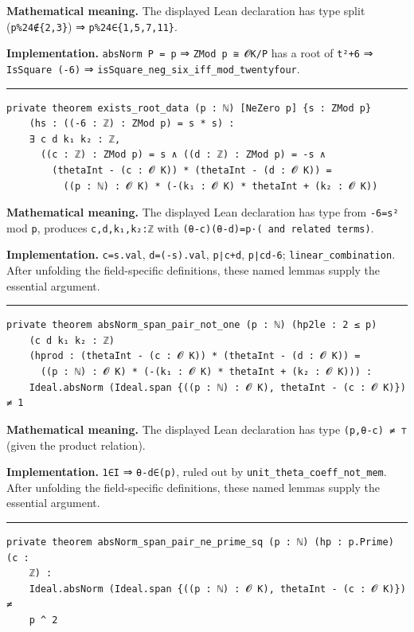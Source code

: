 \documentclass[UTF8,a4paper,11pt,fontset=fandol]{ctexart}
\theoremstyle{definition}
\newcommand{\statementsep}{\par\medskip\hrule\medskip}
\begin{document}
\noindent\textbf{Mathematical meaning.} The displayed Lean declaration has type split (\texttt{p\%24∉\{2,3\}}) ⇒ \texttt{p\%24∈\{1,5,7,11\}}.\par
\noindent\textbf{Implementation.} \texttt{absNorm P = p} ⇒ \texttt{ZMod p ≅ 𝓞K/\allowbreak{}P} has a root of \texttt{t²+6} ⇒ \texttt{IsSquare (-6)} ⇒ \texttt{isSquare\_\allowbreak{}neg\_\allowbreak{}six\_\allowbreak{}iff\_\allowbreak{}mod\_\allowbreak{}twentyfour}.\par
\statementsep
\begin{verbatim}
private theorem exists_root_data (p : ℕ) [NeZero p] {s : ZMod p}
    (hs : ((-6 : ℤ) : ZMod p) = s * s) :
    ∃ c d k₁ k₂ : ℤ,
      ((c : ℤ) : ZMod p) = s ∧ ((d : ℤ) : ZMod p) = -s ∧
        (thetaInt - (c : 𝓞 K)) * (thetaInt - (d : 𝓞 K)) =
          ((p : ℕ) : 𝓞 K) * (-(k₁ : 𝓞 K) * thetaInt + (k₂ : 𝓞 K))
\end{verbatim}
\noindent\textbf{Mathematical meaning.} The displayed Lean declaration has type from \texttt{-6=s²} mod \texttt{p}, produces \texttt{c,d,k₁,k₂:ℤ} with \texttt{(θ-c)(θ-d)=p·( and related terms)}.\par
\noindent\textbf{Implementation.} \texttt{c=s.\allowbreak{}val}, \texttt{d=(-s).\allowbreak{}val}, \texttt{p∣c+d}, \texttt{p∣cd-6}; \texttt{linear\_\allowbreak{}combination}. After unfolding the field-specific definitions, these named lemmas supply the essential argument.\par
\statementsep
\begin{verbatim}
private theorem absNorm_span_pair_not_one (p : ℕ) (hp2le : 2 ≤ p)
    (c d k₁ k₂ : ℤ)
    (hprod : (thetaInt - (c : 𝓞 K)) * (thetaInt - (d : 𝓞 K)) =
      ((p : ℕ) : 𝓞 K) * (-(k₁ : 𝓞 K) * thetaInt + (k₂ : 𝓞 K))) :
    Ideal.absNorm (Ideal.span {((p : ℕ) : 𝓞 K), thetaInt - (c : 𝓞 K)}) ≠ 1
\end{verbatim}
\noindent\textbf{Mathematical meaning.} The displayed Lean declaration has type \texttt{(p,θ-c) ≠ ⊤} (given the product relation).\par
\noindent\textbf{Implementation.} \texttt{1∈I} ⇒ \texttt{θ-d∈(p)}, ruled out by \texttt{unit\_\allowbreak{}theta\_\allowbreak{}coeff\_\allowbreak{}not\_\allowbreak{}mem}. After unfolding the field-specific definitions, these named lemmas supply the essential argument.\par
\statementsep
\begin{verbatim}
private theorem absNorm_span_pair_ne_prime_sq (p : ℕ) (hp : p.Prime) (c :
    ℤ) :
    Ideal.absNorm (Ideal.span {((p : ℕ) : 𝓞 K), thetaInt - (c : 𝓞 K)}) ≠
    p ^ 2
\end{verbatim}
\end{document}
